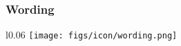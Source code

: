 
\subsubsection{Wording} %
\begin{wrapfigure}{l}{0.06\textwidth}
  \vspace{-11pt} %
    \texttt{[image: figs/icon/wording.png]}
\end{wrapfigure} 

